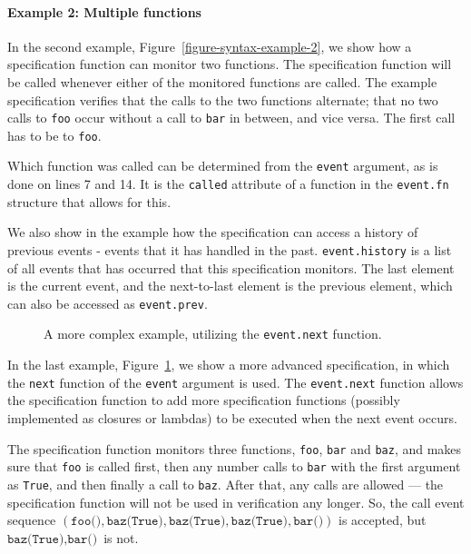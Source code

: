 \paragraph{Example 2: Multiple functions}
In the second example, Figure~\ref{figure-syntax-example-2}, we show how a
specification function can monitor two functions. The specification function
will be called whenever either of the monitored functions are called. The
example specification verifies that the calls to the two functions alternate;
that no two calls to \texttt{foo} occur without a call to \texttt{bar} in
between, and vice versa. The first call has to be to \texttt{foo}.

Which function was called can be determined from the \texttt{event} argument,
as is done on lines 7 and 14. It is the \texttt{called} attribute of a function
in the \texttt{event.fn} structure that allows for this.

We also show in the example how the specification can access a history of
previous events - events that it has handled in the past.
\texttt{event.history} is a list of all events that has occurred that this
specification monitors. The last element is the current event, and the
next-to-last element is the previous element, which can also be accessed as
\texttt{event.prev}.

\begin{figure}[h!]
	\begin{center}
	\begin{minipage}{0.7\textwidth}
	
	\end{minipage}
	\end{center}

  \caption{A more complex example, utilizing the \texttt{event.next} function.}
	\label{figure-syntax-example-3}
\end{figure}

In the last example, Figure~\ref{figure-syntax-example-3}, we show a more
advanced specification, in which the \texttt{next} function of the
\texttt{event} argument is used. The \texttt{event.next} function allows the specification
function to add more specification functions (possibly implemented as closures
or lambdas) to be executed when the next event occurs.

The specification function monitors three functions, \texttt{foo}, \texttt{bar}
and \texttt{baz}, and makes sure that \texttt{foo} is called first, then any
number calls to \texttt{bar} with the first argument as \texttt{True}, and then
finally a call to \texttt{baz}. After that, any calls are allowed --- the
specification function will not be used in verification any longer. So, the
call event sequence $(\texttt{foo()}, \texttt{baz(True)}, \texttt{baz(True)},
\texttt{baz(True)}, \texttt{bar()})$ is accepted, but $\texttt{baz(True)},
\texttt{bar()}$ is not.


